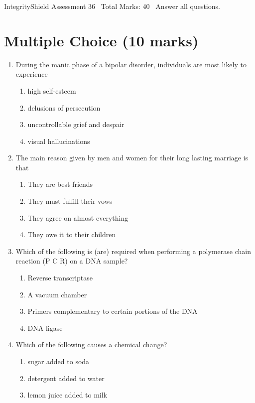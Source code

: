 \documentclass[12pt]{article}
\begin{document}
\begin{center}
IntegrityShield Assessment 36 \
Total Marks: 40 \
Answer all questions.
\end{center}

\section*{Multiple Choice (10 marks)}
\begin{enumerate}[label=\arabic*.]
\item During the manic phase of a bipolar disorder, individuals are most likely to experience
\begin{enumerate}[label=(\alph*)]
    \item high self-esteem
    \item delusions of persecution
    \item uncontrollable grief and despair
    \item visual hallucinations
\end{enumerate}
\item The main reason given by men and women for their long lasting marriage is that
\begin{enumerate}[label=(\alph*)]
    \item They are best friends
    \item They must fulfill their vows
    \item They agree on almost everything
    \item They owe it to their children
\end{enumerate}
\item Which of the following is (are) required when performing a polymerase chain reaction (P C R) on a DNA sample?
\begin{enumerate}[label=(\alph*)]
    \item Reverse transcriptase
    \item A vacuum chamber
    \item Primers complementary to certain portions of the DNA
    \item DNA ligase
\end{enumerate}
\item Which of the following causes a chemical change?
\begin{enumerate}[label=(\alph*)]
    \item sugar added to soda
    \item detergent added to water
    \item lemon juice added to milk

\end{enumerate}
\end{enumerate}
\end{document}
